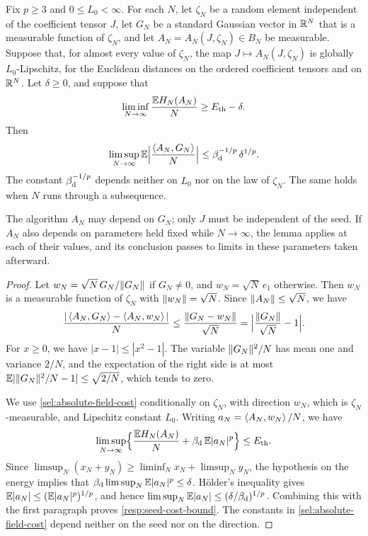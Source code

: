 \begin{lemma}
\label{resp:seed-cost}
Fix $p\ge3$ and $0\le L_0<\infty$. For each $N$, let $\zeta_N$ be a random element independent of the coefficient tensor $J$, let $G_N$ be a standard Gaussian vector in $\mathbb R^N$ that is a measurable function of $\zeta_N$, and let $A_N=A_N(J,\zeta_N)\in B_N$ be measurable. Suppose that, for almost every value of $\zeta_N$, the map $J\mapsto A_N(J,\zeta_N)$ is globally $L_0$-Lipschitz, for the Euclidean distances on the ordered coefficient tensors and on $\mathbb R^N$. Let $\delta\ge0$, and suppose that
\[
 \liminf_{N\to\infty}\frac{\mathbb E H_N(A_N)}N\ge E_{\mathrm{th}}-\delta.
\]
Then
\begin{equation}
 \limsup_{N\to\infty}\mathbb E\Bigl|\frac{\left\langle A_N,G_N\right\rangle}N\Bigr|\le\beta_{\mathrm d}^{-1/p}\,\delta^{1/p}.
 \label{resp:seed-cost-bound}
\end{equation}
The constant $\beta_{\mathrm d}^{-1/p}$ depends neither on $L_0$ nor on the law of $\zeta_N$. The same holds when $N$ runs through a subsequence.
\end{lemma}

The algorithm $A_N$ may depend on $G_N$; only $J$ must be independent of the seed. If $A_N$ also depends on parameters held fixed while $N\to\infty$, the lemma applies at each of their values, and its conclusion passes to limits in these parameters taken afterward.

\begin{proof}
Let $w_N=\sqrt N\,G_N/\lVert G_N\rVert$ if $G_N\ne0$, and $w_N=\sqrt N\,e_1$ otherwise. Then $w_N$ is a measurable function of $\zeta_N$ with $\lVert w_N\rVert=\sqrt N$. Since $\lVert A_N\rVert\le\sqrt N$, we have
\[
 \frac{|\left\langle A_N,G_N\right\rangle-\left\langle A_N,w_N\right\rangle|}N\le\frac{\lVert G_N-w_N\rVert}{\sqrt N}=\Bigl|\frac{\lVert G_N\rVert}{\sqrt N}-1\Bigr|.
\]
For $x\ge0$, we have $|x-1|\le|x^2-1|$. The variable $\lVert G_N\rVert^2/N$ has mean one and variance $2/N$, and the expectation of the right side is at most $\mathbb E|\lVert G_N\rVert^2/N-1|\le\sqrt{2/N}$, which tends to zero.

We use \cref{sel:absolute-field-cost} conditionally on $\zeta_N$, with direction $w_N$, which is $\zeta_N$-measurable, and Lipschitz constant $L_0$. Writing $a_N=\left\langle A_N,w_N\right\rangle/N$, we have
\[
 \limsup_{N\to\infty}\Bigl\{\frac{\mathbb E H_N(A_N)}N+\beta_{\mathrm d}\,\mathbb E|a_N|^p\Bigr\}\le E_{\mathrm{th}}.
\]
Since $\limsup_N(x_N+y_N)\ge\liminf_Nx_N+\limsup_Ny_N$, the hypothesis on the energy implies that $\beta_{\mathrm d}\limsup_N\mathbb E|a_N|^p\le\delta$. Hölder's inequality gives $\mathbb E|a_N|\le(\mathbb E|a_N|^p)^{1/p}$, and hence $\limsup_N\mathbb E|a_N|\le(\delta/\beta_{\mathrm d})^{1/p}$. Combining this with the first paragraph proves \eqref{resp:seed-cost-bound}. The constants in \cref{sel:absolute-field-cost} depend neither on the seed nor on the direction.
\end{proof}

